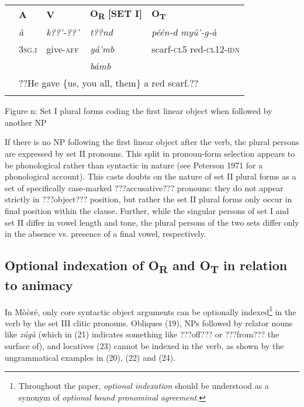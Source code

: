 \documentclass[output=paper]{langsci/langscibook}
\begin{document}
\begin{tabularx}{\textwidth}{XXXXX} & \textbf{A} & \textbf{V} & \textbf{O}\textbf{\textsubscript{R}}\textbf{ [SET I]} & \textbf{O}\textbf{\textsubscript{T}}\textbf{ }\\
\lsptoprule
& \textit{à} & \textit{k??\'{ }-??\`{ }} & \textit{t??nd} & \textit{péén-d         myũ\'{ }-g-à}\\
& 3\textsc{sg.i} & give-\textsc{aff} & \textit{yã\'{ }mb} & scarf-\textsc{cl5}    red-\textsc{cl12-idn}\\
&  &  & \textit{bámb} & \\
& \multicolumn{4}{l}{??He gave \{us, you all, them\} a red scarf.??

}\\
\lspbottomrule
\end{tabularx}
\begin{table}\caption{
\label{bkm:Ref424143970}Figure n: Set I plural forms coding the first linear object when followed by another NP
}\end{table}

If there is no NP following the first linear object after the verb, the plural persons are expressed by set II pronouns. This split in pronoun-form selection appears to be phonological rather than syntactic in nature (see Peterson 1971 for a phonological account). This casts doubts on the nature of set II plural forms as a set of specifically case-marked ???accusative??? pronouns: they do not appear strictly in ???object??? position, but rather the set II plural forms only occur in final position within the clause. Further, while the singular persons of set I and set II differ in vowel length and tone, the plural persons of the two sets differ only in the absence vs. presence of a final vowel, respectively. 

\subsection{Optional indexation of O\textsubscript{R} and O\textsubscript{T} in relation to animacy}

In Mòòré, only core syntactic object arguments can be optionally indexed\footnote{ Throughout the paper, \textit{optional indexation} should be understood as a synonym of \textit{optional bound pronominal agreement}. }{ }in the verb by the set III clitic pronouns. Obliques (19), NPs followed by relator nouns like \emph{zúgù} (which in (21) indicates something like ???off??? or ???from??? the surface of), and locatives (23) cannot be indexed in the verb, as shown by the ungrammatical examples in (20), (22) and (24). 
\end{document}
